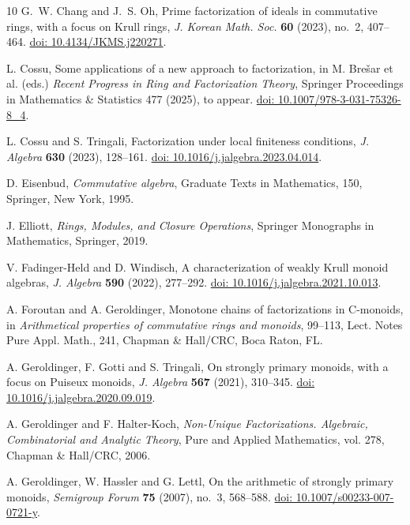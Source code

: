\documentclass[a4paper, 10pt]{amsart}
\theoremstyle{plain}
\theoremstyle{definition}
\theoremstyle{remark}
\numberwithin{equation}{section}
\begin{document}
\begin{thebibliography}{10}
 G.~W. Chang and J.~S. Oh, Prime factorization of ideals in commutative rings, with a focus on Krull rings, {\it J. Korean Math. Soc.} {\bf 60} (2023), no.~2, 407--464. \href{https://doi.org/10.4134/JKMS.j220271}{doi: 10.4134/JKMS.j220271}.

 L. Cossu, Some applications of a new approach to factorization, in M. Bre{\v{s}}ar et al. (eds.) {\it Recent Progress in Ring and Factorization Theory}, Springer Proceedings in Mathematics \& Statistics 477 (2025), to appear. \href{https://doi.org/10.1007/978-3-031-75326-8_4}{doi: 10.1007/978-3-031-75326-8\_4}.

 L. Cossu and S. Tringali, Factorization under local finiteness conditions, {\it J. Algebra} {\bf 630} (2023), 128--161. \href{https://doi.org/10.1016/j.jalgebra.2023.04.014}{doi: 10.1016/j.jalgebra.2023.04.014}.

 D. Eisenbud, {\it Commutative algebra}, Graduate Texts in Mathematics, 150, Springer, New York, 1995.

 J. Elliott, {\it Rings, {M}odules, and {C}losure {O}perations}, Springer
  Monographs in Mathematics, Springer, 2019.

 V. Fadinger-Held and D. Windisch, A characterization of weakly Krull monoid algebras, {\it J. Algebra} {\bf 590} (2022), 277--292. \href{https://doi.org/10.1016/j.jalgebra.2021.10.013}{doi: 10.1016/j.jalgebra.2021.10.013}.

 A. Foroutan and A. Geroldinger, Monotone chains of factorizations in C-monoids, in {\it Arithmetical properties of commutative rings and monoids}, 99--113, Lect. Notes Pure Appl. Math., 241, Chapman \& Hall/CRC, Boca Raton, FL.

 A. Geroldinger, F. Gotti and S. Tringali, On strongly primary monoids, with a focus on Puiseux monoids, {\it J. Algebra} {\bf 567} (2021), 310--345. \href{https://doi.org/10.1016/j.jalgebra.2020.09.019}{doi: 10.1016/j.jalgebra.2020.09.019}.

 A. Geroldinger and F. Halter-Koch, {\it Non-{U}nique {F}actorizations.
  {A}lgebraic, {C}ombinatorial and {A}nalytic {T}heory}, Pure and Applied
  Mathematics, vol. 278, Chapman \& Hall/CRC, 2006.
  
 A. Geroldinger, W. Hassler and G. Lettl, On the arithmetic of strongly primary monoids, {\it Semigroup Forum} {\bf 75} (2007), no.~3, 568--588. \href{https://doi.org/10.1007/s00233-007-0721-y}{doi: 10.1007/s00233-007-0721-y}.


\end{thebibliography}
\end{document}
